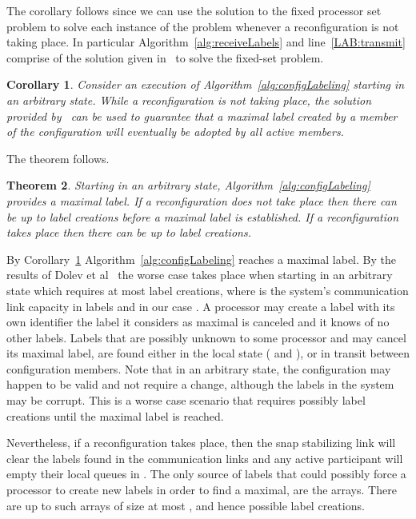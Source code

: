 \documentclass[11pt]{article}
\newtheorem{theorem}{Theorem}[section]
\newtheorem{corollary}[theorem]{Corollary}
\newenvironment{proof}{\noindent{\bf Proof.}}{\hfill}
\begin{document}
The corollary follows since we can use the solution to the fixed processor set problem to solve each instance of the problem whenever a reconfiguration is not taking place.
In particular Algorithm~\ref{alg:receiveLabels} and line~\ref{LAB:transmit} comprise of the solution given in~\cite{SSVS} to solve the fixed-set problem.




\begin{corollary}
\label{thL:maxReached}
Consider an execution  of Algorithm~\ref{alg:configLabeling} starting in an arbitrary state.  
While a reconfiguration is not taking place, the solution provided by~\cite{SSVS} can be used to guarantee that a maximal label created by a member of the configuration will eventually be adopted by all active members.
\end{corollary}

\noindent The theorem follows. 

\begin{theorem}
\label{thL:finalApp}
\label{thL:uniqueLabel}
Starting in an arbitrary state, Algorithm~\ref{alg:configLabeling} provides a maximal label. If a reconfiguration does not take place then there can be up to  label creations before a maximal label is established. If a reconfiguration takes place then there can be up to  label creations.
\end{theorem}

\begin{proof}
By Corollary~\ref{thL:maxReached} Algorithm~\ref{alg:configLabeling} reaches a maximal label.
By the results of Dolev et al~\cite{SSVS} the worse case takes place when starting in an arbitrary state which requires at most  label creations, where  is the system's communication link capacity in labels and in our case .
A processor may create a label with its own identifier the label it considers as maximal is canceled and it knows of no other labels.
Labels that are possibly unknown to some processor and may cancel its maximal label, are found either in the local state (  and ), or in transit between configuration members.
Note that in an arbitrary state, the configuration may happen to be valid and not require a change, although the labels in the system may be corrupt.
This is a worse case scenario that requires possibly  label creations until the maximal label is reached.

Nevertheless, if a reconfiguration takes place, then the snap stabilizing link will clear the  labels found in the communication links and any active participant will empty their local queues in . 
The only source of labels that could possibly force a processor to create new labels in order to find a maximal, are the  arrays.
There are up to  such arrays of size at most , and hence  possible label creations.
\end{proof}
\end{document}
